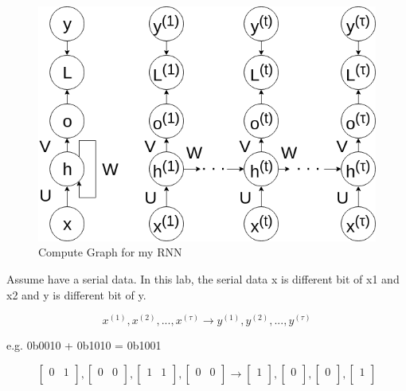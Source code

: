 \documentclass[12pt]{article}
\begin{document}
\begin{figure}[H]
\centering
\includegraphics[width=\linewidth]{Images/RNNCG.png}
\caption{Compute Graph for my RNN}
\end{figure}

Assume have a serial data. In this lab, the serial data x is different bit of x1 and x2 and y is different bit of y.

$$ x^{(1)}, x^{(2)}, ..., x^{(\tau)} \rightarrow y^{(1)}, y^{(2)}, ..., y^{(\tau)} $$

e.g. 0b0010 + 0b1010 = 0b1001

$$
\begin{bmatrix}
0&1\\
\end{bmatrix},
\begin{bmatrix}
0&0\\
\end{bmatrix},
\begin{bmatrix}
1&1\\
\end{bmatrix},
\begin{bmatrix}
0&0\\
\end{bmatrix} \rightarrow
\begin{bmatrix}
1\\
\end{bmatrix},
\begin{bmatrix}
0\\
\end{bmatrix},
\begin{bmatrix}
0\\
\end{bmatrix},
\begin{bmatrix}
1\\
\end{bmatrix}
$$
\end{document}

